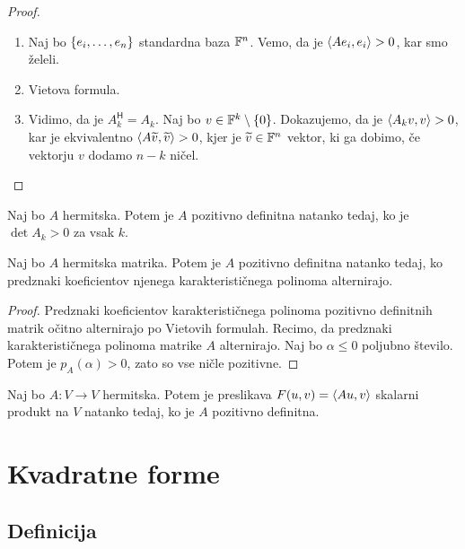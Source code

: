 \documentclass[12pt, a4paper]{article}
\begin{document}
\begin{proof}\phantom{.}
\begin{enumerate}
\item Naj bo $\left\{e_i,\dots,e_n\right\}$ standardna baza $\mathbb{F}^n$. Vemo, da je $\left\langle Ae_i,e_i\right\rangle>0$, kar smo želeli.
\item Vietova formula.
\item Vidimo, da je $A_k^\mathsf{H}=A_k$. Naj bo $v\in\mathbb{F}^k\setminus\left\{0\right\}$. Dokazujemo, da je $\left\langle A_kv,v\right\rangle>0$, kar je ekvivalentno $\left\langle A\widetilde{v},\widetilde{v}\right\rangle>0$, kjer je $\widetilde{v}\in\mathbb{F}^n$ vektor, ki ga dobimo, če vektorju $v$ dodamo $n-k$ ničel.\qedhere
\end{enumerate}
\end{proof}

\begin{trditev}
Naj bo $A$ hermitska. Potem je $A$ pozitivno definitna natanko tedaj, ko je $\det A_k>0$ za vsak $k$.
\end{trditev}

\begin{izrek}
Naj bo $A$ hermitska matrika. Potem je $A$ pozitivno definitna natanko tedaj, ko predznaki koeficientov njenega karakterističnega polinoma alternirajo.
\end{izrek}

\begin{proof}
Predznaki koeficientov karakterističnega polinoma pozitivno definitnih matrik očitno alternirajo po Vietovih formulah. Recimo, da predznaki karakterističnega polinoma matrike $A$ alternirajo. Naj bo $\alpha\leq 0$ poljubno število. Potem je $p_A(\alpha)>0$, zato so vse ničle pozitivne.
\end{proof}

\begin{trditev}
Naj bo $A\colon V\to V$ hermitska. Potem je preslikava $F(u,v)=\left\langle Au,v\right\rangle$ skalarni produkt na $V$ natanko tedaj, ko je $A$ pozitivno definitna.
\end{trditev}

\obvs

\newpage

\section{Kvadratne forme}

\subsection{Definicija}
\end{document}
